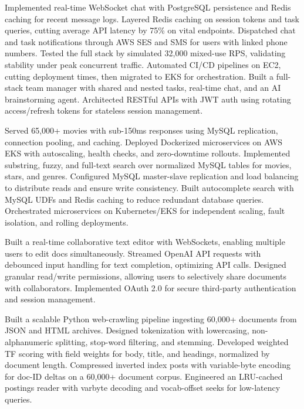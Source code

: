 

Implemented real-time WebSocket chat with PostgreSQL persistence and Redis caching for recent message logs.
Layered Redis caching on session tokens and task queries, cutting average API latency by 75\% on vital endpoints.
Dispatched chat and task notifications through AWS SES and SMS for users with linked phone numbers.
Tested the full stack by simulated 32,000 mixed-use RPS, validating stability under peak concurrent traffic.
Automated CI/CD pipelines on EC2, cutting deployment times, then migrated to EKS for orchestration.
Built a full-stack team manager with shared and nested tasks, real-time chat, and an AI brainstorming agent.
Architected RESTful APIs with JWT auth using rotating access/refresh tokens for stateless session management.


Served 65,000+ movies with sub-150ms responses using MySQL replication, connection pooling, and caching.
Deployed Dockerized microservices on AWS EKS with autoscaling, health checks, and zero-downtime rollouts.
Implemented substring, fuzzy, and full-text search over normalized MySQL tables for movies, stars, and genres.
Configured MySQL master-slave replication and load balancing to distribute reads and ensure write consistency.
Built autocomplete search with MySQL UDFs and Redis caching to reduce redundant database queries.
Orchestrated microservices on Kubernetes/EKS for independent scaling, fault isolation, and rolling deployments.


Built a real-time collaborative text editor with WebSockets, enabling multiple users to edit docs simultaneously.
Streamed OpenAI API requests with debounced input handling for text completion, optimizing API calls.
Designed granular read/write permissions, allowing users to selectively share documents with collaborators.
Implemented OAuth 2.0 for secure third-party authentication and session management.


Built a scalable Python web-crawling pipeline ingesting 60,000+ documents from JSON and HTML archives.
Designed tokenization with lowercasing, non-alphanumeric splitting, stop-word filtering, and stemming.
Developed weighted TF scoring with field weights for body, title, and headings, normalized by document length.
Compressed inverted index posts with variable-byte encoding for doc-ID deltas on a 60,000+ document corpus.
Engineered an LRU-cached postings reader with varbyte decoding and vocab-offset seeks for low-latency queries.




